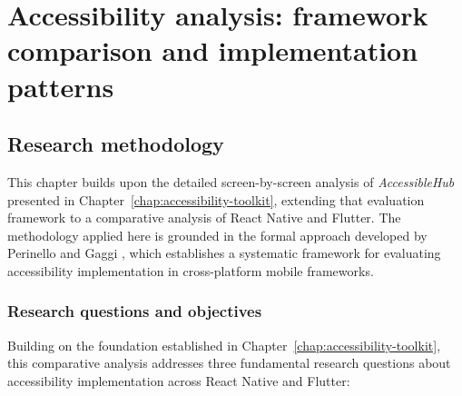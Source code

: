 \chapter{Accessibility analysis: framework comparison and implementation patterns} 
\label{chap:accessibility-implementation}

\section{Research methodology}
This chapter builds upon the detailed screen-by-screen analysis of \textit{AccessibleHub} presented in Chapter~\ref{chap:accessibility-toolkit}, extending that evaluation framework to a comparative analysis of React Native and Flutter. The methodology applied here is grounded in the formal approach developed by Perinello and Gaggi \cite{perinello2024accessibility}, which establishes a systematic framework for evaluating accessibility implementation in cross-platform mobile frameworks.

\subsection{Research questions and objectives}

Building on the foundation established in Chapter~\ref{chap:accessibility-toolkit}, this comparative analysis addresses three fundamental research questions about accessibility implementation across React Native and Flutter:

